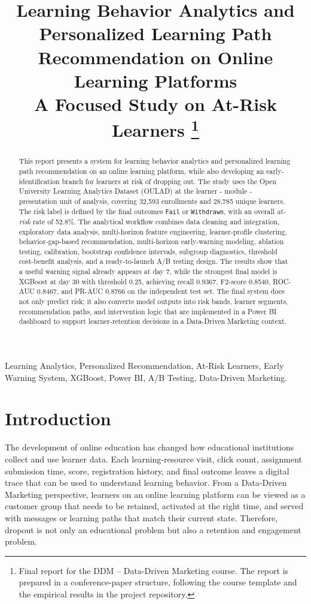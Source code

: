 \documentclass[conference]{IEEEtran}
\title{
Learning Behavior Analytics and Personalized Learning Path Recommendation on Online Learning Platforms\\
\vspace{0.5cm}
\large A Focused Study on At-Risk Learners
\thanks{Final report for the DDM -- Data-Driven Marketing course. The report is prepared in a conference-paper structure, following the course template and the empirical results in the project repository.}
}
\author{
\IEEEauthorblockN{Group 7: Ha Quang Minh, Bui Huynh Gia Huy, Ngo Hoang Phuc, Nguyen Tran Quoc Dat, Truong Duc Anh}
\IEEEauthorblockA{
DSEB 65B\\
Course: DDM -- Data-Driven Marketing
}
}
\newcommand{\risk}{\textit{at-risk}}
\begin{document}
\maketitle

\begin{abstract}
This report presents a system for learning behavior analytics and personalized learning path recommendation on an online learning platform, while also developing an early-identification branch for learners at risk of dropping out. The study uses the Open University Learning Analytics Dataset (OULAD) at the learner - module - presentation unit of analysis, covering 32,593 enrollments and 28,785 unique learners. The risk label is defined by the final outcomes \texttt{Fail} or \texttt{Withdrawn}, with an overall \risk{} rate of 52.8\%. The analytical workflow combines data cleaning and integration, exploratory data analysis, multi-horizon feature engineering, learner-profile clustering, behavior-gap-based recommendation, multi-horizon early-warning modeling, ablation testing, calibration, bootstrap confidence intervals, subgroup diagnostics, threshold cost-benefit analysis, and a ready-to-launch A/B testing design. The results show that a useful warning signal already appears at day 7, while the strongest final model is XGBoost at day 30 with threshold 0.25, achieving recall 0.9367, F2-score 0.8540, ROC-AUC 0.8467, and PR-AUC 0.8766 on the independent test set. The final system does not only predict risk; it also converts model outputs into risk bands, learner segments, recommendation paths, and intervention logic that are implemented in a Power BI dashboard to support learner-retention decisions in a Data-Driven Marketing context.
\end{abstract}

\begin{IEEEkeywords}
Learning Analytics, Personalized Recommendation, At-Risk Learners, Early Warning System, XGBoost, Power BI, A/B Testing, Data-Driven Marketing.
\end{IEEEkeywords}

\section{Introduction}

The development of online education has changed how educational institutions collect and use learner data. Each learning-resource visit, click count, assignment submission time, score, registration history, and final outcome leaves a digital trace that can be used to understand learning behavior. From a Data-Driven Marketing perspective, learners on an online learning platform can be viewed as a customer group that needs to be retained, activated at the right time, and served with messages or learning paths that match their current state. Therefore, dropout is not only an educational problem but also a retention and engagement problem.
\end{document}
